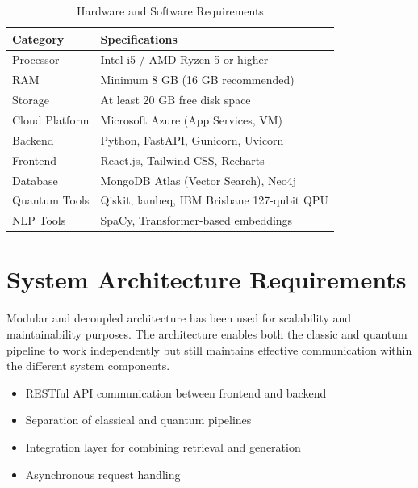 \begin{table}[htbp]
    \vspace{-1em}
    \centering
    \caption{Hardware and Software Requirements}
    \label{tab:hardware_software}
    \begin{tabular}{|p{4cm}|p{8cm}|}
        \hline
        \textbf{Category} & \textbf{Specifications} \\
        \hline
        Processor & Intel i5 / AMD Ryzen 5 or higher \\
        \hline
        RAM & Minimum 8 GB (16 GB recommended) \\
        \hline
        Storage & At least 20 GB free disk space \\
        \hline
        Cloud Platform & Microsoft Azure (App Services, VM) \\
        \hline
        Backend & Python, FastAPI, Gunicorn, Uvicorn \\
        \hline
        Frontend & React.js, Tailwind CSS, Recharts \\
        \hline
        Database & MongoDB Atlas (Vector Search), Neo4j \\
        \hline
        Quantum Tools & Qiskit, lambeq, IBM Brisbane 127-qubit QPU \\
        \hline
        NLP Tools & SpaCy, Transformer-based embeddings \\
        \hline
    \end{tabular}
\end{table}

\section{System Architecture Requirements}

Modular and decoupled architecture has been used for scalability and maintainability purposes. The architecture enables both the classic and quantum pipeline to work independently but still maintains effective communication within the different system components.

\begin{itemize}
    \item RESTful API communication between frontend and backend
    \item Separation of classical and quantum pipelines
    \item Integration layer for combining retrieval and generation
    \item Asynchronous request handling
\end{itemize}

